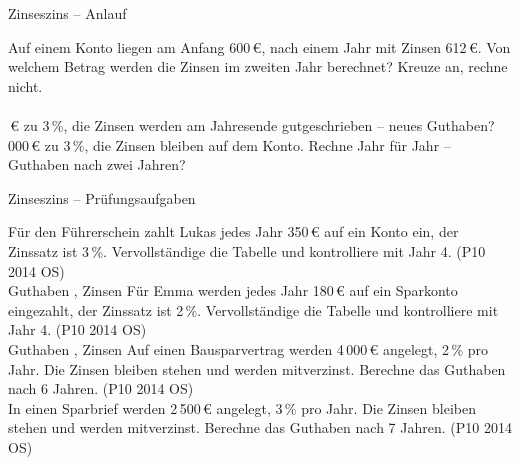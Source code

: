 \begin{aufgabe}{Zinseszins – Anlauf}
\begin{teile}
\teil Auf einem Konto liegen am Anfang 600\,€, nach einem Jahr mit Zinsen 612\,€. Von welchem Betrag werden die Zinsen im zweiten Jahr berechnet? Kreuze an, rechne nicht. \\  \\ 
\,€ zu 3\,\%, die Zinsen werden am Jahresende gutgeschrieben – neues Guthaben? \leerfeld[€]
\,000\,€ zu 3\,\%, die Zinsen bleiben auf dem Konto. Rechne Jahr für Jahr – Guthaben nach zwei Jahren? \leerfeld[€]
\end{teile}
\end{aufgabe}

\begin{aufgabe}{Zinseszins – Prüfungsaufgaben}
\begin{teile}
\teil Für den Führerschein zahlt Lukas jedes Jahr 350\,€ auf ein Konto ein, der Zinssatz ist 3\,\%. Vervollständige die Tabelle und kontrolliere mit Jahr 4. \hfill (P10 2014 OS) \\

Guthaben \leerfeld[€] , Zinsen \leerfeld[€]
\teil Für Emma werden jedes Jahr 180\,€ auf ein Sparkonto eingezahlt, der Zinssatz ist 2\,\%. Vervollständige die Tabelle und kontrolliere mit Jahr 4. \hfill (P10 2014 OS) \\

Guthaben \leerfeld[€] , Zinsen \leerfeld[€]
\teil Auf einen Bausparvertrag werden 4\,000\,€ angelegt, 2\,\% pro Jahr. Die Zinsen bleiben stehen und werden mitverzinst. Berechne das Guthaben nach 6 Jahren. \hfill (P10 2014 OS) \\ \leerfeld[€]
\teil In einen Sparbrief werden 2\,500\,€ angelegt, 3\,\% pro Jahr. Die Zinsen bleiben stehen und werden mitverzinst. Berechne das Guthaben nach 7 Jahren. \hfill (P10 2014 OS) \\ \leerfeld[€]
\end{teile}
\end{aufgabe}
